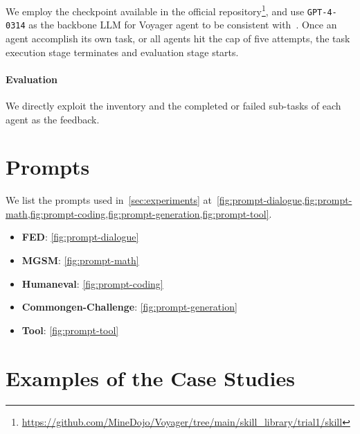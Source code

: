 We employ the checkpoint available in the official repository\footnote{\url{https://github.com/MineDojo/Voyager/tree/main/skill_library/trial1/skill}}, and use \texttt{GPT-4-0314} as the backbone LLM for Voyager agent to be consistent with~\citet{DBLP:journals/corr/abs-2305-16291}. Once an agent accomplish its own task, or all agents hit the cap of five attempts, the task execution stage terminates and evaluation stage starts.

\paragraph{Evaluation}
We directly exploit the inventory and the completed or failed sub-tasks of each agent as the feedback.

\section{Prompts}
\label{sec:appendix-prompts}
We list the prompts used in~\cref{sec:experiments} at~\cref{fig:prompt-dialogue,fig:prompt-math,fig:prompt-coding,fig:prompt-generation,fig:prompt-tool}.
\begin{itemize}
    \item \textbf{FED}: \cref{fig:prompt-dialogue}
    \item \textbf{MGSM}: \cref{fig:prompt-math}
    \item \textbf{Humaneval}: \cref{fig:prompt-coding}
    \item \textbf{Commongen-Challenge}: \cref{fig:prompt-generation}
    \item \textbf{Tool}: \cref{fig:prompt-tool}
\end{itemize}









\section{Examples of the Case Studies}
\label{sec:appendix-examples}

